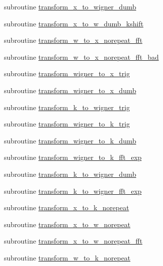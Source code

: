 \begin{DoxyCompactItemize}
\item 
subroutine \hyperlink{namespacemesh_ab0c4d2eefb660f80c8bd5a26cfea90bb}{transform\_\-x\_\-to\_\-wigner\_\-dumb}
\item 
subroutine \hyperlink{namespacemesh_aedb02cc0a4ac5c08aef3398b9bca30be}{transform\_\-x\_\-to\_\-w\_\-dumb\_\-kshift}
\item 
subroutine \hyperlink{namespacemesh_af0c42421bd8b5b74a00094f639c4f7c7}{transform\_\-w\_\-to\_\-x\_\-norepeat\_\-fft}
\item 
subroutine \hyperlink{namespacemesh_ac641e03ceee3eaba6206a6e3b03db6af}{transform\_\-w\_\-to\_\-x\_\-norepeat\_\-fft\_\-bad}
\item 
subroutine \hyperlink{namespacemesh_a59d4c181b47238269732a26ba618696e}{transform\_\-wigner\_\-to\_\-x\_\-trig}
\item 
subroutine \hyperlink{namespacemesh_aee41613b43ab6e2f5a715e21c4227f4c}{transform\_\-wigner\_\-to\_\-x\_\-dumb}
\item 
subroutine \hyperlink{namespacemesh_ad6c116013ec5d5d4b1e8298749ffa481}{transform\_\-k\_\-to\_\-wigner\_\-trig}
\item 
subroutine \hyperlink{namespacemesh_affe8a5fb2705abf8f10cbac993ae66ff}{transform\_\-wigner\_\-to\_\-k\_\-trig}
\item 
subroutine \hyperlink{namespacemesh_ad10642a5ceb6239ab5dbf2124a221b45}{transform\_\-wigner\_\-to\_\-k\_\-dumb}
\item 
subroutine \hyperlink{namespacemesh_ac76ffd458b6317525fb12c63498439e4}{transform\_\-wigner\_\-to\_\-k\_\-fft\_\-exp}
\item 
subroutine \hyperlink{namespacemesh_a10655d39a753ec023b2c6b9d36db4663}{transform\_\-k\_\-to\_\-wigner\_\-dumb}
\item 
subroutine \hyperlink{namespacemesh_a6d0133c6c55c6bfd1929d28d4e48e2d6}{transform\_\-k\_\-to\_\-wigner\_\-fft\_\-exp}
\item 
subroutine \hyperlink{namespacemesh_a4f07e4d7944353c1362be2da4e27b16e}{transform\_\-x\_\-to\_\-k\_\-norepeat}
\item 
subroutine \hyperlink{namespacemesh_a1f4e0012bc7646af71d9f56ff2abc54d}{transform\_\-x\_\-to\_\-w\_\-norepeat}
\item 
subroutine \hyperlink{namespacemesh_adde9e08568da14a3b33bfb7372563330}{transform\_\-x\_\-to\_\-w\_\-norepeat\_\-fft}
\item 
subroutine \hyperlink{namespacemesh_accd03020a8a261cbf51d9642814db3cb}{transform\_\-w\_\-to\_\-k\_\-norepeat}
\end{DoxyCompactItemize}
